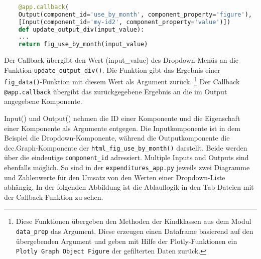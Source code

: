     \begin{lstlisting}[language=Python, caption={html\_fig\_total\_expnd()}]        
    
    @app.callback(
    Output(component_id='use_by_month', component_property='figure'),
    [Input(component_id='my-id2', component_property='value')])
    def update_output_div(input_value):
    ...
    return fig_use_by_month(input_value)
    \end{lstlisting}


 
    Der Callback übergibt den Wert (input\_value) des Dropdown-Menüs an die Funktion \texttt{update\_output\_div()}. 
    Die Funktion gibt das Ergebnis einer \texttt{fig\_data()}-Funktion mit diesem Wert als Argument zurück.
    \footnote{Diese Funktionen übergeben den Methoden der Kindklassen aus dem Modul \texttt{data\_prep} das Argument. 
    Diese erzeugen einen Dataframe basierend auf den übergebenden Argument und geben mit Hilfe der Plotly-Funktionen ein \texttt{Plotly Graph Object Figure} der gefilterten Daten zurück.}
    Der Callback \texttt{@app.callback} übergibt das zurückgegebene Ergebnis an die im Output angegebene Komponente.
    
    Input() und Output() nehmen die ID einer Komponente und die Eigenschaft einer Komponente als Argumente entgegen.
    Die Inputkomponente ist in dem Beispiel die Dropdown-Komponente, während die Outputkomponente die dcc.Graph-Komponente der
    \texttt{html\_fig\_use\_by\_month()} darstellt. Beide werden über die eindeutige \texttt{component\_id} adressiert.
    Multiple Inputs and Outputs sind ebenfalls möglich. So sind in der \texttt{expenditures\_app.py}
    jeweils zwei Diagramme und Zahlenwerte für den Umsatz von den Werten einer Dropdown-Liste abhängig.
    In der folgenden Abbildung ist die Ablauflogik in den Tab-Dateien mit der Callback-Funktion zu sehen.

